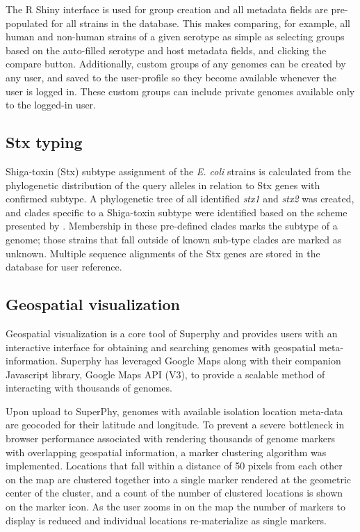 \documentclass[doublespacing, linenumbers]{bmcart}
\begin{document}
The R Shiny interface is used for group creation and all metadata fields are pre-populated for all strains in the database. This makes comparing, for example, all human and non-human strains of a given serotype as simple as selecting groups based on the auto-filled serotype and host metadata fields, and clicking the compare button. Additionally, custom groups of any genomes can be created by any user, and saved to the user-profile so they become available whenever the user is logged in. These custom groups can include private genomes available only to the logged-in user.

\subsection{Stx typing}
Shiga-toxin (Stx) subtype assignment of the \textit{E. coli} strains is calculated from the phylogenetic distribution of the query alleles in relation to Stx genes with confirmed subtype. A phylogenetic tree of all identified \textit{stx1} and \textit{stx2} was created, and clades specific to a Shiga-toxin subtype were identified based on the scheme presented by \cite{scheutz_multicenter_2012}. Membership in these pre-defined clades marks the subtype of a genome; those strains that fall outside of known sub-type clades are marked as unknown. Multiple sequence alignments of the Stx genes are stored in the database for user reference.

\subsection{Geospatial visualization}
Geospatial visualization is a core tool of Superphy and provides users with an interactive interface for obtaining and searching genomes with geospatial meta-information. Superphy has leveraged Google Maps along with their companion Javascript library, Google Maps API (V3), to provide a scalable method of interacting with thousands of genomes. 

Upon upload to SuperPhy, genomes with available isolation location meta-data are geocoded for their latitude and longitude. To prevent a severe bottleneck in browser performance associated with rendering thousands of genome markers with overlapping geospatial information, a marker clustering algorithm was implemented. Locations that fall within a distance of 50 pixels from each other on the map are clustered together into a single marker rendered at the geometric center of the cluster, and a count of the number of clustered locations is shown on the marker icon. As the user zooms in on the map the number of markers to display is reduced and individual locations re-materialize as single markers. 
\end{document}
